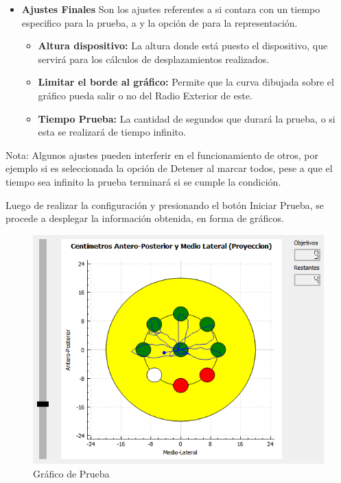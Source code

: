 \documentclass[12pt,a4paper]{article}
\begin{document}
\begin{itemize}
	\item \textbf{Ajustes Finales} Son los ajustes referentes a si contara con un tiempo especifico para la prueba, a  y la opción de  para la representación.
	\begin{itemize}
		\item \textbf{Altura dispositivo:} La altura donde está puesto el dispositivo, que servirá para los cálculos de desplazamientos realizados.
		\item \textbf{Limitar el borde al gráfico:} Permite que la curva dibujada sobre el gráfico pueda salir o no del Radio Exterior de este.
		\item \textbf{Tiempo Prueba:} La cantidad de segundos que durará la prueba, o si esta se realizará de tiempo infinito.
	\end{itemize}
\end{itemize}

Nota: Algunos ajustes pueden interferir en el funcionamiento de otros, por ejemplo si es seleccionada la opción de Detener al marcar todos, pese a que el tiempo sea infinito la prueba terminará si se cumple la condición.

Luego de realizar la configuración y presionando el botón Iniciar Prueba, se procede a desplegar la información obtenida, en forma de gráficos.

\begin{figure}[H]
	\centering
	\includegraphics[scale=0.7]{images/graficoPrincipal}
	\caption{Gráfico de Prueba}
	\label{fig:graficoPrincipal}
\end{figure}
\end{document}
